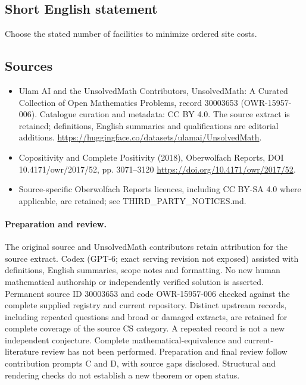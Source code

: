 \documentclass[11pt]{article}
\begin{document}
\subsection{Short English statement}
Choose the stated number of facilities to minimize ordered site costs.
\subsection{Sources}
\begin{itemize}
\item[\hypertarget{source:30003653:1}{S1}] Ulam AI and the UnsolvedMath Contributors, UnsolvedMath: A Curated Collection of Open Mathematics Problems, record 30003653 (OWR-15957-006). Catalogue curation and metadata: CC BY 4.0. The source extract is retained; definitions, English summaries and qualifications are editorial additions.
\url{https://huggingface.co/datasets/ulamai/UnsolvedMath}.
\item[\hypertarget{source:30003653:2}{S2}] Copositivity and Complete Positivity (2018), Oberwolfach Reports, DOI 10.4171/owr/2017/52, pp. 3071--3120
\url{https://doi.org/10.4171/owr/2017/52}.
\item Source-specific Oberwolfach Reports licences, including CC BY-SA 4.0 where applicable, are retained; see THIRD\_PARTY\_NOTICES.md.
\end{itemize}
\paragraph{Preparation and review.}
The original source and UnsolvedMath contributors retain attribution for the source extract. Codex (GPT-6; exact serving revision not exposed) assisted with definitions, English summaries, scope notes and formatting. No new human mathematical authorship or independently verified solution is asserted. Permanent source ID 30003653 and code OWR-15957-006 checked against the complete supplied registry and current repository. Distinct upstream records, including repeated questions and broad or damaged extracts, are retained for complete coverage of the source CS category. A repeated record is not a new independent conjecture. Complete mathematical-equivalence and current-literature review has not been performed. Preparation and final review follow contribution prompts C and D, with source gaps disclosed. Structural and rendering checks do not establish a new theorem or open status.
\label{end:30003653}
\end{document}
